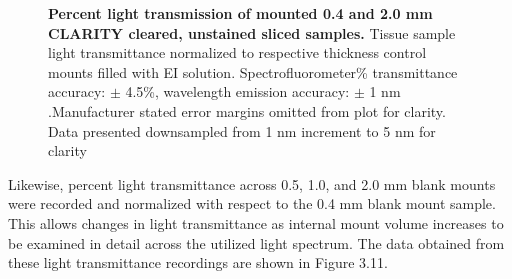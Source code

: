 \begin{figure}[H]
    \centering
    \caption{\textbf{Percent light transmission of mounted 0.4 and 2.0 mm CLARITY cleared, unstained sliced samples.} Tissue sample light transmittance normalized to respective thickness control mounts filled with EI solution. Spectrofluorometer\% transmittance accuracy: $\pm$ 4.5\%, wavelength emission accuracy: $\pm$ 1 nm \cite{noauthor_duetta_nodate}.Manufacturer stated error margins omitted from plot for clarity. Data presented downsampled from 1 nm increment to 5 nm for clarity}
    \label{fig:enter-label}
\end{figure}

Likewise, percent light transmittance across 0.5, 1.0, and 2.0 mm blank mounts were recorded and normalized with respect to the 0.4 mm blank mount sample. This allows changes in light transmittance as internal mount volume increases to be examined in detail across the utilized light spectrum. The data obtained from these light transmittance recordings are shown in Figure 3.11.
    
